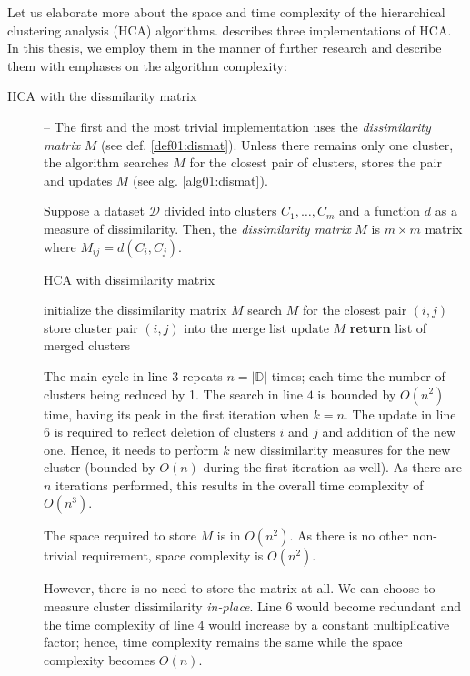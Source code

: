 Let us elaborate more about the space and time complexity of the hierarchical clustering analysis (HCA) algorithms. \citet{day1984efficient} describes three implementations of HCA. In this thesis, we employ them in the manner of further research and describe them with emphases on the algorithm complexity:

\begin{description}
	\item[HCA with the dissmilarity matrix] -- The first and the most trivial implementation uses the \emph{dissimilarity matrix} $M$ (see def. \ref{def01:dismat}). Unless there remains only one cluster, the algorithm searches $M$ for the closest pair of clusters, stores the pair and updates $M$ (see alg. \ref{alg01:dismat}).
	
	\begin{defn}
		Suppose a dataset $\mathcal{D}$ divided into clusters $C_1,\dots,C_m$ and a function $d$ as a measure of dissimilarity. Then, the \emph{dissimilarity matrix} $M$ is $m\times m$ matrix where $M_{ij} = d(C_i,C_j)$.
		\label{def01:dismat}
	\end{defn}
	
	\begin{algorithm}
		\caption{HCA with dissimilarity matrix}
		\label{alg01:dismat}
		\begin{algorithmic}[1]
			\State initialize the dissimilarity matrix $M$
			\State search $M$ for the closest pair $(i,j)$ 
			\State store cluster pair $(i,j)$ into the merge list 
			\State update $M$ 
			\EndFor
			\State \textbf{return} list of merged clusters
			\EndProcedure
		\end{algorithmic}
	\end{algorithm}

	The main cycle in line $3$ repeats $n = |\mathbb{D}|$ times; each time the number of clusters being reduced by 1. The search in line $4$ is bounded by $O(n^2)$ time, having its peak in the first iteration when $k=n$. The update in line $6$ is required to reflect deletion of clusters $i$ and $j$ and addition of the new one. Hence, it needs to perform $k$ new dissimilarity measures for the new cluster (bounded by $O(n)$ during the first iteration as well). As there are $n$ iterations performed, this results in the overall time complexity of $O(n^3)$. 
	
	The space required to store $M$ is in $O(n^2)$. As there is no other non-trivial requirement, space complexity is $O(n^2)$. 
	\begin{rem}
		However, there is no need to store the matrix at all. We can choose to measure cluster dissimilarity \emph{in-place}. Line $6$ would become redundant and the time complexity of line $4$ would increase by a constant multiplicative factor; hence, time complexity remains the same while the space complexity becomes $O(n)$.
	\end{rem}
	


\end{description}
